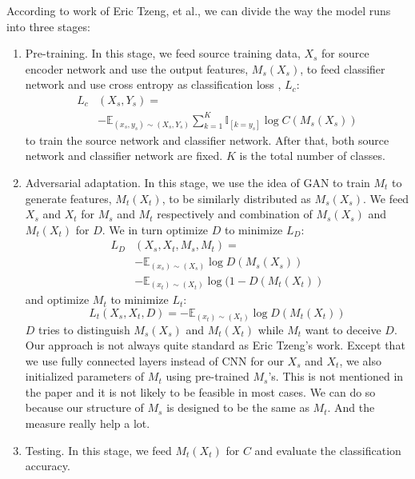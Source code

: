 \documentclass[conference]{IEEEtran}
\begin{document}
According to work of Eric Tzeng, et al., we can divide the way the model runs into three stages:
\begin{enumerate}
  \item Pre-training. In this stage, we feed source training data, $X_{s}$ for source encoder network and use the output features, $M_s(X_{s})$, to feed classifier network and use cross entropy as classification loss , $L_{c}$:
      \begin{equation}\label{cls_loss}
      \begin{aligned}
        L_{c} & (X_{s}, Y_{s}) =  \\
        &-\mathbb{E}_{(x_s,y_s) \sim (X_s,Y_s)}
        \sum\limits_{k=1}^{K} \mathbb{I}_{[k=y_s]} \log C(M_s(X_{s}))
        \end{aligned}
      \end{equation}
       to train the source network and classifier network. After that, both source network and classifier network are fixed. $K$ is the total number of classes.
  \item Adversarial adaptation. In this stage, we use the idea of GAN to train $M_t$ to generate features, $M_t(X_{t})$, to be similarly distributed as $M_s(X_{s})$. We feed $X_s$ and $X_t$ for $M_s$ and $M_t$ respectively and combination of $M_s(X_{s})$ and $M_t(X_{t})$ for $D$. We in turn optimize $D$ to minimize $L_{D}$:
      \begin{equation}\label{LD}
        \begin{aligned}
        L_{D} & (X_{s}, X_{t}, M_s, M_t) =  \\
                                        &-\mathbb{E}_{(x_s) \sim (X_s)} \log D(M_s(X_{s})) \\
                                        &-\mathbb{E}_{(x_t) \sim (X_t)} \log (1 - D(M_t(X_{t}))
            \end{aligned}
      \end{equation}
      and optimize $M_t$ to minimize
      $L_{t}$:
      \begin{equation}\label{Lt}
        L_{t}(X_{s}, X_{t}, D) =
            -\mathbb{E}_{(x_t) \sim (X_t)} \log D(M_t(X_{t}))
      \end{equation}
      $D$ tries to distinguish $M_s(X_{s})$ and $M_t(X_{t})$ while $M_t$ want to deceive $D$. \\
      Our approach is not always quite standard as Eric Tzeng's work. Except that we use fully connected layers instead of CNN for our $X_s$ and $X_t$, we also initialized parameters of $M_t$ using pre-trained $M_s$'s. This is not mentioned in the paper and it is not likely to be feasible in most cases. We can do so because our structure of $M_s$ is designed to be the same as $M_t$. And the measure really help a lot.
  \item Testing. In this stage, we feed $M_t(X_t)$ for $C$ and evaluate the classification accuracy.
\end{enumerate}
\end{document}
